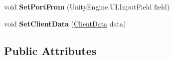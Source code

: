 \begin{DoxyCompactItemize}
\item 
\hypertarget{class_skyrates_1_1_common_1_1_network_1_1_session_a764278ea696340505adeb6a927f46458}{void {\bfseries Set\-Port\-From} (Unity\-Engine.\-U\-I.\-Input\-Field field)}\label{class_skyrates_1_1_common_1_1_network_1_1_session_a764278ea696340505adeb6a927f46458}

\item 
\hypertarget{class_skyrates_1_1_common_1_1_network_1_1_session_ad262e811e482f06dcba65d8afc70abd3}{void {\bfseries Set\-Client\-Data} (\hyperlink{class_skyrates_1_1_server_1_1_network_1_1_client_data}{Client\-Data} data)}\label{class_skyrates_1_1_common_1_1_network_1_1_session_ad262e811e482f06dcba65d8afc70abd3}

\end{DoxyCompactItemize}
\subsection*{Public Attributes}
